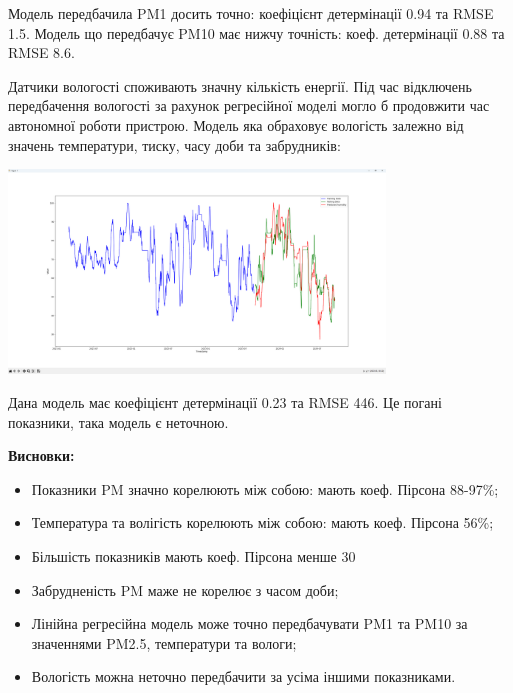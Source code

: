 \documentclass{article}
\begin{document}
Модель передбачила PM1 досить точно: коефіцієнт детермінації 0.94 та RMSE 1.5. Модель що передбачує PM10 має нижчу точність: коеф. детермінації 0.88 та RMSE 8.6.\\\indent

Датчики вологості споживають значну кількість енергії. Під час відключень передбачення вологості за рахунок регресійної моделі могло б продовжити час автономної роботи пристрою. Модель яка обраховує вологість залежно від значень температури, тиску, часу доби та забрудників:\\\indent
\begin{center}
    \includegraphics[width=100mm]{humidity}
\end{center}

Дана модель має коефіцієнт детермінації 0.23 та RMSE 446. Це погані показники, така модель є неточною.\\\indent


\newpage

\textbf{Висновки:}\\\indent
\begin{itemize}
	\item Показники PM значно корелюють між собою: мають коеф. Пірсона 88-97\%;
	\item Температура та волігість корелюють між собою: мають коеф. Пірсона 56\%;
	\item Більшість показників мають коеф. Пірсона менше 30%
	\item Забрудненість PM маже не корелює з часом доби;
	\item Лінійна регресійна модель може точно передбачувати PM1 та PM10 за значеннями PM2.5, температури та вологи;
	\item Вологість можна неточно передбачити за усіма іншими показниками.
\end{itemize}
\end{document}
